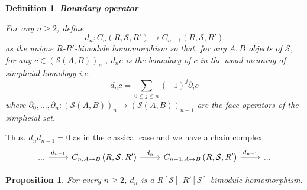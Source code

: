 \documentclass[a4paper,fleqn]{cas-sc}
\newtheorem{prop}[thm]{Proposition}%
\newtheorem{dfnt}{Definition}%
\newcommand{\cS}{{\mathcal{S}}}
\begin{document}
\begin{dfnt}{\textbf{Boundary operator}}

For any $n \geq 2$, define 
\[d_n: C_n \left( R, \cS, R'\right) \to C_{n-1} \left( R, \cS, R'\right)\]
as the unique $R$-$R'$-bimodule homomorphism so that, for any $A, B$ objects of $\cS$, for any $c \in (\cS(A,B))_n$ , $d_n c$ is the boundary of $c$ in the usual meaning of simplicial homology i.e. 
\[d_n c = \sum_{0 \leq j \leq n} {(-1)}^j \partial_i c \]
where $\partial_0, \dots, \partial_n : (\cS(A,B))_n \to (\cS(A,B))_{n-1}$ are the face operators of the simplicial set. 
\end{dfnt}

Thus, $d_n d_{n-1} = 0$ as in the classical case and we have a chain complex 
\[\begin{tikzcd}
	{...} & C_{n, A \to B} \left( R, \cS, R'\right) & C_{n-1, A \to B} \left( R, \cS, R'\right) & {...}
	\arrow["{d_{n+1}}", from=1-1, to=1-2]
	\arrow["{d_n}", from=1-2, to=1-3]
	\arrow["{d_{n-1}}", from=1-3, to=1-4]
\end{tikzcd}\]



\begin{prop}
For every $n \geq 2$, $d_n$ is a $R[\cS]$-$R'[\cS]$-bimodule homomorphism.
\end{prop}
\end{document}
